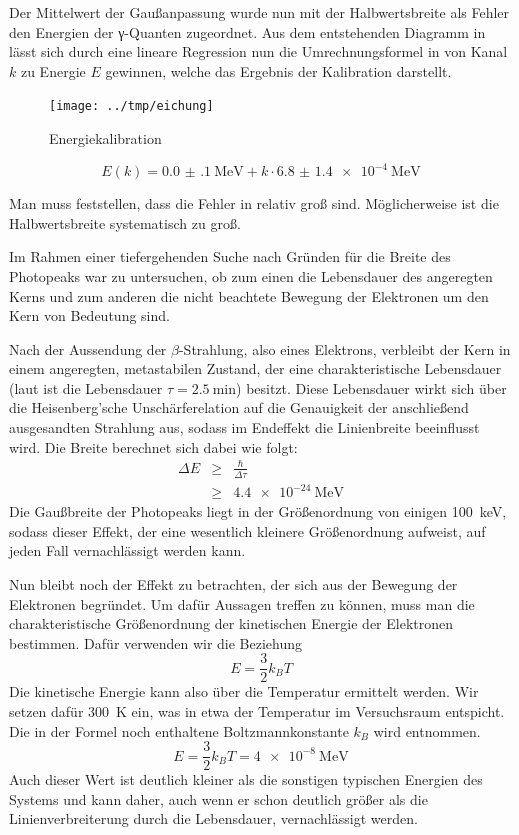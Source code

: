 Der Mittelwert der Gaußanpassung wurde nun mit der Halbwertsbreite als Fehler
den Energien der γ-Quanten zugeordnet. Aus dem entstehenden Diagramm in
 lässt sich durch eine lineare Regression nun die
Umrechnungsformel in  von Kanal $k$ zu Energie $E$ gewinnen,
welche das Ergebnis der Kalibration darstellt.

\begin{figure}[htb]
      \centering
      \texttt{[image: ../tmp/eichung]}
      \caption{Energiekalibration}
      \label{fig:eichung}
\end{figure}

\begin{equation}
 E(k) = \SI{0.0(1)}{\mega\eV} + k\cdot\SI{6.8(14)e-4}{\mega\eV}
 \label{eqn:eichung}
\end{equation}

Man muss feststellen, dass die Fehler in  relativ groß sind.
Möglicherweise ist die Halbwertsbreite systematisch zu groß.

Im Rahmen einer tiefergehenden Suche nach Gründen für die Breite des Photopeaks
war zu untersuchen, ob zum einen die Lebensdauer des angeregten Kerns und zum
anderen die nicht beachtete Bewegung der Elektronen um den Kern von Bedeutung
sind.

Nach der Aussendung der $\beta$-Strahlung, also eines Elektrons, verbleibt der
Kern in einem angeregten, metastabilen Zustand, der eine charakteristische
Lebensdauer (laut \cite[Abb. 4]{script} ist die Lebensdauer $\tau =
\SI{2,5}{\minute}$) besitzt. Diese Lebensdauer wirkt sich über die
Heisenberg'sche Unschärferelation auf die Genauigkeit der anschließend
ausgesandten Strahlung aus, sodass im Endeffekt die Linienbreite beeinflusst
wird. Die Breite berechnet sich dabei wie folgt:
\begin{eqnarray}
\Delta E &\geq& \frac{\hbar}{\Delta \tau}\\
&\geq& \SI{4,4e-24}{\mega\eV}
\end{eqnarray}
Die Gaußbreite der Photopeaks liegt in der Größenordnung von einigen
\SI{100}{\kilo\eV}, sodass dieser Effekt, der eine wesentlich kleinere
Größenordnung aufweist, auf jeden Fall vernachlässigt werden kann.

Nun bleibt noch der Effekt zu betrachten, der sich aus der Bewegung der
Elektronen begründet. Um dafür Aussagen treffen zu können, muss man die
charakteristische Größenordnung der kinetischen Energie der Elektronen
bestimmen. Dafür verwenden wir die Beziehung
\begin{equation}
E = \frac{3}{2}k_BT
\end{equation}
Die kinetische Energie kann also über die Temperatur ermittelt werden. Wir
setzen dafür \SI{300}{\kelvin} ein, was in etwa der Temperatur im Versuchsraum
entspicht. Die in der Formel noch enthaltene Boltzmannkonstante $k_B$ wird
\cite{pdb} entnommen.
\begin{equation}
E = \frac{3}{2}k_BT = \SI{4e-8}{\mega\eV}
\end{equation}
Auch dieser Wert ist deutlich kleiner als die sonstigen typischen Energien des
Systems und kann daher, auch wenn er schon deutlich größer als die
Linienverbreiterung durch die Lebensdauer, vernachlässigt werden.

